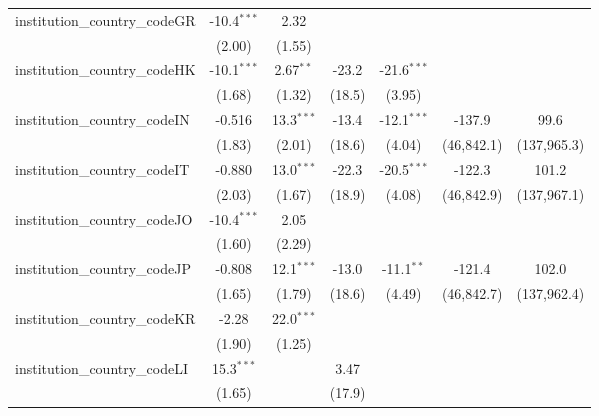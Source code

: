 \begin{tabular}{lcccccc}
   institution\_country\_codeGR          & -10.4$^{***}$ & 2.32          &               &               &              &   \\   
                                         & (2.00)        & (1.55)        &               &               &              &   \\   
   institution\_country\_codeHK          & -10.1$^{***}$ & 2.67$^{**}$   & -23.2         & -21.6$^{***}$ &              &   \\   
                                         & (1.68)        & (1.32)        & (18.5)        & (3.95)        &              &   \\   
   institution\_country\_codeIN          & -0.516        & 13.3$^{***}$  & -13.4         & -12.1$^{***}$ & -137.9       & 99.6\\   
                                         & (1.83)        & (2.01)        & (18.6)        & (4.04)        & (46,842.1)   & (137,965.3)\\   
   institution\_country\_codeIT          & -0.880        & 13.0$^{***}$  & -22.3         & -20.5$^{***}$ & -122.3       & 101.2\\   
                                         & (2.03)        & (1.67)        & (18.9)        & (4.08)        & (46,842.9)   & (137,967.1)\\   
   institution\_country\_codeJO          & -10.4$^{***}$ & 2.05          &               &               &              &   \\   
                                         & (1.60)        & (2.29)        &               &               &              &   \\   
   institution\_country\_codeJP          & -0.808        & 12.1$^{***}$  & -13.0         & -11.1$^{**}$  & -121.4       & 102.0\\   
                                         & (1.65)        & (1.79)        & (18.6)        & (4.49)        & (46,842.7)   & (137,962.4)\\   
   institution\_country\_codeKR          & -2.28         & 22.0$^{***}$  &               &               &              &   \\   
                                         & (1.90)        & (1.25)        &               &               &              &   \\   
   institution\_country\_codeLI          & 15.3$^{***}$  &               & 3.47          &               &              &   \\   
                                         & (1.65)        &               & (17.9)        &               &              &   \\   

\end{tabular}
